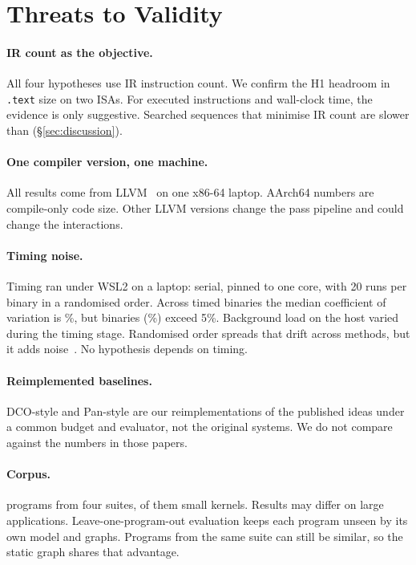 \section{Threats to Validity}
\label{sec:threats}

\paragraph{IR count as the objective.}
All four hypotheses use IR instruction count. We confirm the H1 headroom in \texttt{.text} size on
two ISAs. For executed instructions and wall-clock time, the evidence is only suggestive. Searched
sequences that minimise IR count are slower than \Othree{} (\S\ref{sec:discussion}).

\paragraph{One compiler version, one machine.}
All results come from LLVM~\LLVMVersion{} on one x86-64 laptop. AArch64 numbers are compile-only
code size. Other LLVM versions change the pass pipeline and could change the interactions.

\paragraph{Timing noise.}
Timing ran under WSL2 on a laptop: serial, pinned to one core, with 20 runs per binary in a
randomised order. Across \NRuntimeBinaries{} timed binaries the median coefficient of variation is
\RuntimeCV\%, but \RuntimeNoisy{} binaries (\RuntimeNoisyPct\%) exceed 5\%. Background load on the
host varied during the timing stage. Randomised order spreads that drift across methods, but it
adds noise~\cite{mytkowicz2009}. No hypothesis depends on timing.

\paragraph{Reimplemented baselines.}
DCO-style and Pan-style are our reimplementations of the published ideas under a common budget and
evaluator, not the original systems. We do not compare against the numbers in those papers.

\paragraph{Corpus.}
\NPrograms{} programs from four suites, \NOwn{} of them small kernels. Results may differ on
large applications. Leave-one-program-out evaluation keeps each program unseen by its own model and
graphs. Programs from the same suite can still be similar, so the static graph shares that
advantage.

